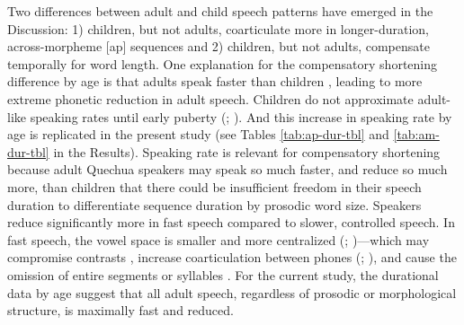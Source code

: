 \documentclass[a4paper,man,floatsintext,natbib,donotrepeattitle, apacite]{apa6}
\begin{document}
Two differences between adult and child speech patterns have emerged in the Discussion: 1) children, but not adults, coarticulate more in longer-duration, across-morpheme [ap] sequences and 2) children, but not adults, compensate temporally for word length. One explanation for the compensatory shortening difference by age is that adults speak faster than children \citep{leeAcousticsChildrenSpeech1999}, leading to more extreme phonetic reduction in adult speech. Children do not approximate adult-like speaking rates until early puberty (\citealt{leeAcousticsChildrenSpeech1999}; \citealt{smithRelationshipsDurationTemporal1992}). And this increase in speaking rate by age is replicated in the present study (see Tables \ref{tab:ap-dur-tbl} and \ref{tab:am-dur-tbl} in the Results). Speaking rate is relevant for compensatory shortening because adult Quechua speakers may speak so much faster, and reduce so much more, than children that there could be insufficient freedom in their speech duration to differentiate sequence duration by prosodic word size. Speakers reduce significantly more in fast speech compared to slower, controlled speech. In fast speech, the vowel space is smaller and more centralized (\citealt{fourakisTempoStressVowel1991}; \citealt{tsaoEffectIntertalkerSpeech2006})---which may compromise contrasts \citep{koopmans-vanbeinumVowelContrastReduction1980}, increase coarticulation between phones (\citealt{agwueleEffectSpeakingRate2008}; \citealt{matthiesVariationAnticipatoryCoarticulation2001}), and cause the omission of entire segments or syllables \citep{johnsonMassiveReductionConversational2004}. For the current study, the durational data by age suggest that all adult speech, regardless of prosodic or morphological structure, is maximally fast and reduced.  
\end{document}

